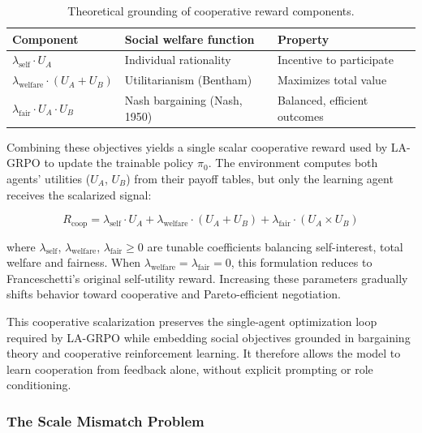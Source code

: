 \documentclass[12pt,a4paper]{article}
\begin{document}
\begin{table}[H]
\centering
\caption{Theoretical grounding of cooperative reward components.}
\label{tab:reward_components}
\begin{tabular}{lll}
\toprule
\textbf{Component} & \textbf{Social welfare function} & \textbf{Property} \\
\midrule
$\lambda_{\text{self}} \cdot U_A$ & Individual rationality & Incentive to participate \\
$\lambda_{\text{welfare}} \cdot (U_A + U_B)$ & Utilitarianism (Bentham) & Maximizes total value \\
$\lambda_{\text{fair}} \cdot U_A \cdot U_B$ & Nash bargaining (Nash, 1950) & Balanced, efficient outcomes \\
\bottomrule
\end{tabular}
\end{table}

Combining these objectives yields a single scalar cooperative reward used by LA-GRPO to update the trainable policy $\pi_0$. The environment computes both agents' utilities ($U_A$, $U_B$) from their payoff tables, but only the learning agent receives the scalarized signal:

\begin{equation}
R_{\text{coop}} = \lambda_{\text{self}} \cdot U_A + \lambda_{\text{welfare}} \cdot (U_A + U_B) + \lambda_{\text{fair}} \cdot (U_A \times U_B)
\label{eq:rcoop_raw}
\end{equation}

where $\lambda_{\text{self}}$, $\lambda_{\text{welfare}}$, $\lambda_{\text{fair}} \geq 0$ are tunable coefficients balancing self-interest, total welfare and fairness. When $\lambda_{\text{welfare}} = \lambda_{\text{fair}} = 0$, this formulation reduces to Franceschetti's original self-utility reward. Increasing these parameters gradually shifts behavior toward cooperative and Pareto-efficient negotiation.
\par
This cooperative scalarization preserves the single-agent optimization loop required by LA-GRPO while embedding social objectives grounded in bargaining theory and cooperative reinforcement learning. It therefore allows the model to learn cooperation from feedback alone, without explicit prompting or role conditioning.


\subsubsection{The Scale Mismatch Problem}
\end{document}
